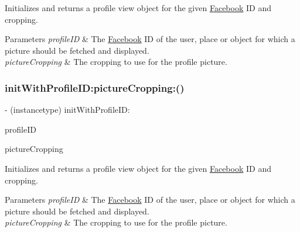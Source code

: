 Initializes and returns a profile view object for the given \hyperlink{interfaceFacebook}{Facebook} ID and cropping.


\begin{DoxyParams}{Parameters}
{\em profile\+ID} & The \hyperlink{interfaceFacebook}{Facebook} ID of the user, place or object for which a picture should be fetched and displayed. \\
\hline
{\em picture\+Cropping} & The cropping to use for the profile picture. \\
\hline
\end{DoxyParams}
\mbox{\label{interfaceFBProfilePictureView_ac31bbd3ec87c79d3b1ccd4f3466e46b1}} 
\subsubsection{\texorpdfstring{init\+With\+Profile\+I\+D\+:picture\+Cropping\+:()}{initWithProfileID:pictureCropping:()}\hspace{0.1cm}{\footnotesize\ttfamily [2/5]}}
{\footnotesize\ttfamily -\/ (instancetype) init\+With\+Profile\+I\+D\+: \begin{DoxyParamCaption}\item[{(N\+S\+String $\ast$)}]{profile\+ID }\item[{pictureCropping:(F\+B\+Profile\+Picture\+Cropping)}]{picture\+Cropping }\end{DoxyParamCaption}}

Initializes and returns a profile view object for the given \hyperlink{interfaceFacebook}{Facebook} ID and cropping.


\begin{DoxyParams}{Parameters}
{\em profile\+ID} & The \hyperlink{interfaceFacebook}{Facebook} ID of the user, place or object for which a picture should be fetched and displayed. \\
\hline
{\em picture\+Cropping} & The cropping to use for the profile picture. \\
\hline
\end{DoxyParams}
\mbox{\label{interfaceFBProfilePictureView_ac31bbd3ec87c79d3b1ccd4f3466e46b1}} 
